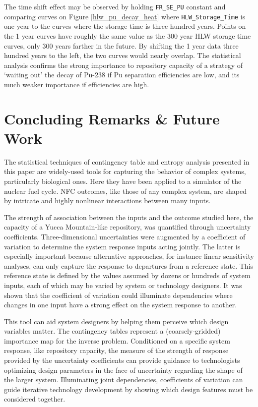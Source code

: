 \documentclass[a4paper, 12pt]{article}
\begin{document}
The time shift effect may be observed by holding \texttt{FR\_SE\_PU} constant and comparing curves on Figure \ref{hlw_pu_decay_heat}
where \texttt{HLW\_Storage\_Time} is one year to the curves where the storage time is three hundred years.  Points on the 1 year curves have
roughly the same value as the 300 year HLW storage time curves, only 300 years farther in the future.  By shifting the 1 year data
three hundred years to the left, the two curves would nearly overlap.  The statistical analysis confirms the strong importance to repository capacity of a strategy of `waiting out' the decay of Pu-238 if Pu separation efficiencies are low, and its much weaker importance if efficiencies are high.

\section{Concluding Remarks \& Future Work}
\label{sec:conclusion}

The statistical techniques of contingency table and entropy analysis presented in this paper are widely-used tools for capturing the behavior of complex systems, particularly biological ones.  Here they have been applied to a simulator of the nuclear fuel cycle.  NFC outcomes, like those of any complex system, are shaped by intricate and highly nonlinear interactions between many inputs.

The strength of association between the inputs and the outcome studied here, the capacity of a Yucca Mountain-like repository, was quantified through uncertainty coefficients.  Three-dimensional uncertainties were augmented by a coefficient of variation to determine the system response inputs acting jointly.  The latter is especially important because alternative approaches, for instance linear sensitivity analyses, can only capture the response to departures from a reference state.  This reference state is defined by the values assumed by dozens or hundreds of system inputs, each of which may be varied by system or technology designers.  It was shown that the coefficient of variation could illuminate dependencies where changes in one input have a strong effect on the system response to another.  

This tool can aid system designers by helping them perceive which design variables matter.  The contingency tables represent a (coarsely-gridded) importance map for the inverse problem.  Conditioned on a specific system response, like repository capacity, the measure of the strength of response provided by the uncertainty coefficients can provide guidance to technologists optimizing design parameters in the face of uncertainty regarding the shape of the larger system.  Illuminating joint dependencies, coefficients of variation can guide iterative technology development by showing which design features must be considered together.
\end{document}
